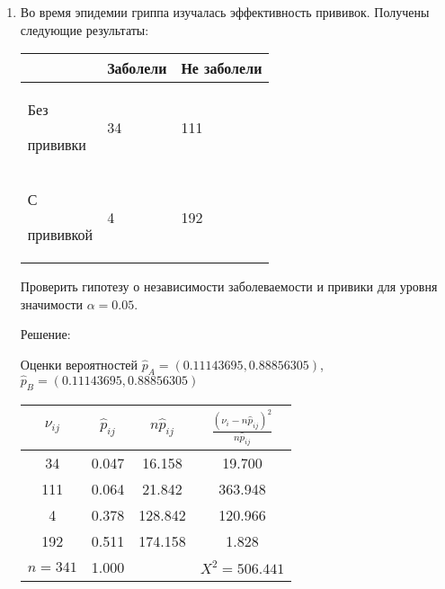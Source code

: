 \documentclass[a4paper,12pt]{article}
\newif\ifsolutions
\begin{document}
\begin{enumerate}
      \item \cite[306]{Efimov} Во время эпидемии гриппа изучалась эффективность прививок. Получены следующие результаты:

            \begin{center}
                  \begin{tabular}{|P{3cm}|P{3cm}|P{3cm}|}
                        \hline
                                          & Заболели & Не заболели \\
                        \hline
                        Без \par прививки & 34       & 111         \\
                        \hline
                        С \par прививкой  & 4        & 192         \\
                        \hline
                  \end{tabular}
            \end{center}

            Проверить гипотезу о независимости заболеваемости и привики для уровня значимости $\alpha = 0.05$.

            \ifsolutions Решение: \par
                  Оценки вероятностей $\widehat{p}_A = (0.11143695, 0.88856305)$, $\widehat{p}_B = (0.11143695, 0.88856305)$

                  \begin{tabular}{|c|c|c|c|}
                        \hline
                        $\nu_{ij}$ & $\widehat{p}_{ij}$ & $n \widehat{p}_{ij}$ & $\frac{(\nu_i - n \widehat{p}_{ij})^2}{n \widehat{p}_{ij}}$ \\
                        \hline
                        34         & 0.047              & 16.158               & 19.700                                                      \\
                        111        & 0.064              & 21.842               & 363.948                                                     \\
                        4          & 0.378              & 128.842              & 120.966                                                     \\
                        192        & 0.511              & 174.158              & 1.828                                                       \\
                        \hline
                        $n = 341$  & 1.000              &                      & $X^2 =  506.441$                                            \\
                        \hline
                  \end{tabular}


\end{enumerate}
\end{document}
